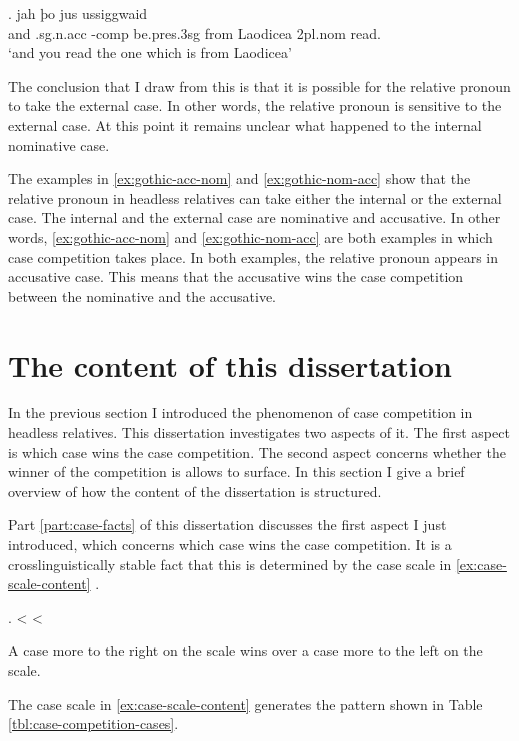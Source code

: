 \exg. jah þo     jus ussiggwaid\\
 and .\ac{sg}.\ac{n}.\ac{acc} -\ac{comp} be.\ac{pres}.3\ac{sg}\scsub{[nom]} from Laodicea 2\ac{pl}.\ac{nom} read.\scsub{[acc]}\\
 `and you read the one which is from Laodicea' \label{ex:gothic-nom-acc}

The conclusion that I draw from this is that it is possible for the relative pronoun to take the external case. In other words, the relative pronoun is sensitive to the external case.
At this point it remains unclear what happened to the internal nominative case.

The examples in \ref{ex:gothic-acc-nom} and \ref{ex:gothic-nom-acc} show that the relative pronoun in headless relatives can take either the internal or the external case. The internal and the external case are nominative and accusative. In other words, \ref{ex:gothic-acc-nom} and \ref{ex:gothic-nom-acc} are both examples in which case competition takes place. In both examples, the relative pronoun appears in accusative case. This means that the accusative wins the case competition between the nominative and the accusative.


\section{The content of this dissertation}

In the previous section I introduced the phenomenon of case competition in headless relatives. This dissertation investigates two aspects of it. The first aspect is which case wins the case competition. The second aspect concerns whether the winner of the competition is allows to surface. In this section I give a brief overview of how the content of the dissertation is structured.

Part \ref{part:case-facts} of this dissertation discusses the first aspect I just introduced, which concerns which case wins the case competition. It is a crosslinguistically stable fact that this is determined by the case scale in \ref{ex:case-scale-content} \citep[cf.][]{grosu1994}.

\ex.\label{ex:case-scale-content}  <  < 

A case more to the right on the scale wins over a case more to the left on the scale.

The case scale in \ref{ex:case-scale-content} generates the pattern shown in Table \ref{tbl:case-competition-cases}.

